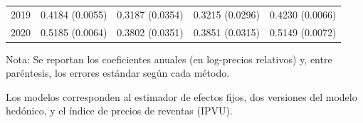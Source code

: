 \documentclass[conference]{IEEEtran}
\begin{document}
\begin{table}[H]
\begin{threeparttable}
\begin{tabular}{lcccc}
2019 & 0.4184 (0.0055) & 0.3187 (0.0354) & 0.3215 (0.0296) & 0.4230 (0.0066) \\
2020 & 0.5185 (0.0064) & 0.3802 (0.0351) & 0.3851 (0.0315) & 0.5149 (0.0072) \\
\bottomrule
\end{tabular}
\begin{tablenotes}
\footnotesize
\item Nota: Se reportan los coeficientes anuales (en log-precios relativos) y, entre paréntesis, los errores estándar según cada método. 
\item Los modelos corresponden al estimador de efectos fijos, dos versiones del modelo hedónico, y el índice de precios de reventas (IPVU).
\end{tablenotes}
\end{threeparttable}
\end{table}
\end{document}
